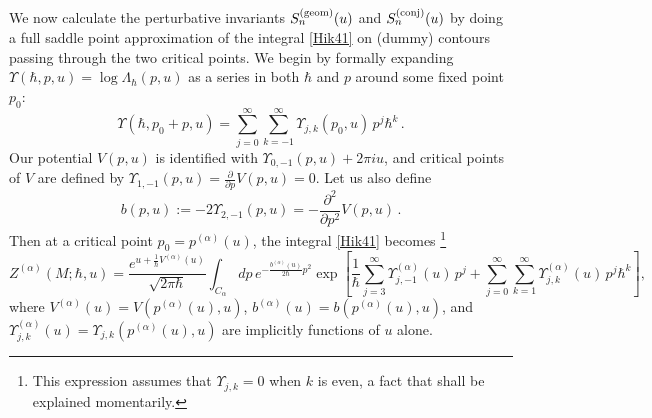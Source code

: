 \documentclass[hyper]{JHEP3}
\newcommand\be{\begin{equation}}
\newcommand\ee{\end{equation}}
\begin{document}
We now calculate the perturbative invariants $S_n^{({\rm geom})}(u)$ and $S_n^{({\rm conj})}(u)$
by doing a full saddle point approximation of the integral \eqref{Hik41}
on (dummy) contours passing through the two critical points.
We begin by formally expanding $\Upsilon (\hbar,p,u) = \log \Lambda_{\hbar} (p,u)$
as a series in both $\hbar$ and $p$ around some fixed point $p_0$:
\be
\Upsilon(\hbar, p_0+p,u) = \sum_{j=0}^\infty \sum_{k=-1}^\infty\Upsilon_{j,k}(p_0,u)\,p^j\hbar^k\,.
\ee
Our potential $V(p,u)$ is identified with $\Upsilon_{0,-1}(p,u)+2\pi iu$,
and critical points of $V$ are defined by
$\Upsilon_{1,-1}(p,u) = \frac{\partial}{\partial p} V(p,u) = 0$.
Let us also define
%
\be b(p,u) := -2\Upsilon_{2,-1}(p,u) = -\frac{\partial^2}{\partial p^2}V(p,u)\,. \ee
%
Then at a critical point $p_0 = p^{(\alpha)}(u)$, the integral \eqref{Hik41} becomes%
%
\footnote{This expression assumes that $\Upsilon_{j,k}=0$ when $k$ is even,
a fact that shall be explained momentarily.}
\small
\be
Z^{(\alpha)} (M; \hbar, u) = \frac{e^{u+\frac{1}{\hbar}V^{(\alpha)}(u)}}{\sqrt{2 \pi \hbar}}
\int_{C_{\alpha}} dp\, e^{-\frac{b^{(\alpha)}(u)}{2\hbar}p^2} \exp\left[\frac{1}{\hbar}
\sum_{j=3}^\infty \Upsilon_{j,-1}^{(\alpha)}(u)\,p^j
+ \sum_{j=0}^\infty\sum_{k=1}^\infty \Upsilon_{j,k}^{(\alpha)}(u)\,p^j \hbar^k \right],
\label{saddle_integral}
\ee
\normalsize
where $V^{(\alpha)}(u) = V(p^{(\alpha)}(u),u)$,\; $b^{(\alpha)}(u) = b(p^{(\alpha)}(u),u)$,
and $\Upsilon_{j,k}^{(\alpha)}(u)=\Upsilon_{j,k}(p^{(\alpha)}(u),u)$ are implicitly functions of $u$ alone.
\end{document}
